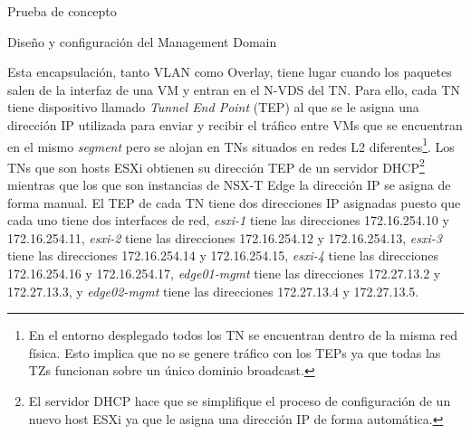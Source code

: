 \begin{section}{Prueba de concepto}
\begin{subsection}{Diseño y configuración del Management Domain}

    Esta encapsulación, tanto VLAN como Overlay, tiene lugar cuando los paquetes salen de la interfaz de una VM y entran en el N-VDS del TN. Para ello, cada TN tiene dispositivo llamado \textit{Tunnel End Point} (TEP) al que se le asigna una dirección IP utilizada para enviar y recibir el tráfico entre VMs que se encuentran en el mismo \textit{segment} pero se alojan en TNs situados en redes L2 diferentes\footnote{En el entorno desplegado todos los TN se encuentran dentro de la misma red física. Esto implica que no se genere tráfico con los TEPs ya que todas las TZs funcionan sobre un único dominio broadcast.}. Los TNs que son hosts ESXi obtienen su dirección TEP de un servidor DHCP\footnote{El servidor DHCP hace que se simplifique el proceso de configuración de un nuevo host ESXi ya que le asigna una dirección IP de forma automática.} mientras que los que son instancias de NSX-T Edge la dirección IP se asigna de forma manual. El TEP de cada TN tiene dos direcciones IP asignadas puesto que cada uno tiene dos interfaces de red, \textit{esxi-1} tiene las direcciones 172.16.254.10 y 172.16.254.11, \textit{esxi-2} tiene las direcciones 172.16.254.12 y 172.16.254.13, \textit{esxi-3} tiene las direcciones 172.16.254.14 y 172.16.254.15, \textit{esxi-4} tiene las direcciones 172.16.254.16 y 172.16.254.17, \textit{edge01-mgmt} tiene las direcciones 172.27.13.2 y 172.27.13.3, y \textit{edge02-mgmt} tiene las direcciones 172.27.13.4 y 172.27.13.5.
    

\end{subsection}
\end{section}
